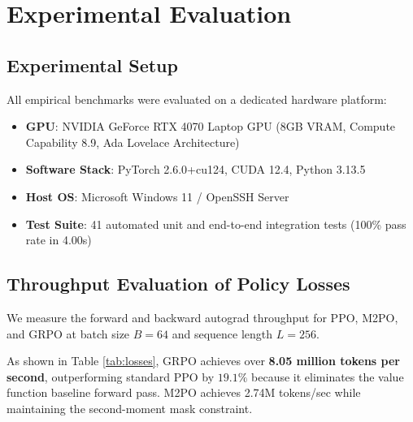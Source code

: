 \documentclass[10pt,twocolumn,letterpaper]{article}
\begin{document}
\section{Experimental Evaluation}

\subsection{Experimental Setup}

All empirical benchmarks were evaluated on a dedicated hardware platform:
\begin{itemize}
    \item \textbf{GPU}: NVIDIA GeForce RTX 4070 Laptop GPU (8GB VRAM, Compute Capability 8.9, Ada Lovelace Architecture)
    \item \textbf{Software Stack}: PyTorch 2.6.0+cu124, CUDA 12.4, Python 3.13.5
    \item \textbf{Host OS}: Microsoft Windows 11 / OpenSSH Server
    \item \textbf{Test Suite}: 41 automated unit and end-to-end integration tests (100\% pass rate in 4.00s)
\end{itemize}

\subsection{Throughput Evaluation of Policy Losses}

We measure the forward and backward autograd throughput for PPO, M2PO, and GRPO at batch size $B=64$ and sequence length $L=256$.

\begin{table}[t]
\centering
\caption{Policy loss computational throughput on NVIDIA RTX 4070 GPU ($B=64, L=256$, 30 iterations).}
\label{tab:losses}
\end{table}

As shown in Table \ref{tab:losses}, GRPO achieves over \textbf{8.05 million tokens per second}, outperforming standard PPO by $19.1\%$ because it eliminates the value function baseline forward pass. M2PO achieves 2.74M tokens/sec while maintaining the second-moment mask constraint.
\end{document}
